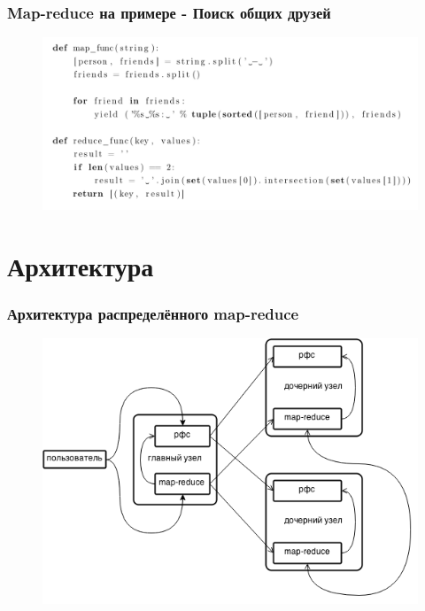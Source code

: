 \documentclass[utf8]{beamer}
\begin{document}
    \begin{frame}
    \frametitle{Map-reduce на примере - Поиск общих друзей}
        \begin{figure}[h!]
            \centering
            \includegraphics[scale=0.28]{code_sample.png}
        \end{figure}        
    \end{frame}
    
\section{Архитектура}

    \begin{frame}
    \frametitle{Архитектура распределённого map-reduce}
        \begin{figure}[h!]
            \centering
            \includegraphics[scale=0.45]{framework_total.png}
        \end{figure}        
    \end{frame}
\end{document}
